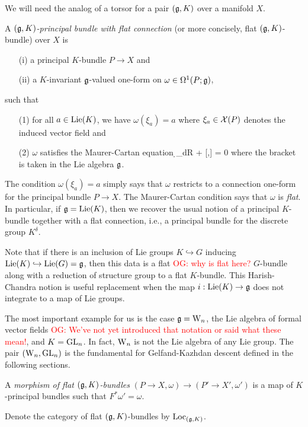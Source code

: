 \documentclass[10pt]{amsart}
\def\owen{\textcolor{red}{OG: }\textcolor{red}}
\begin{document}
We will need the analog of a torsor for a pair $(\mathfrak g,K)$ over a
manifold $X$.


\begin{dfn} \label{gkbun}
A {\em $(\mathfrak g,K)$-principal bundle with flat connection} (or more concisely, flat $(\mathfrak g,K)$-bundle) over $X$ is 
\begin{itemize}
\item[(i)] a principal $K$-bundle $P \to X$ and
\item[(ii)] a $K$-invariant $\mathfrak g$-valued one-form on $\omega \in \Omega^1(P; \mathfrak g)$, 
\end{itemize}
such that 
\begin{itemize}
\item[(1)] for all $a \in {\rm Lie}(K)$, we have $\omega(\xi_a) = a$ where $\xi_a \in \mathcal X(P)$ denotes the induced vector field and 
\item[(2)] $\omega$ satisfies the Maurer-Cartan equation
\ben
\d_{dR} \omega + [\omega,\omega] = 0
\een
where the bracket is taken in the Lie algebra $\mathfrak g$. 
\end{itemize}
\end{dfn}

The condition $\omega(\xi_a) = a$ simply says that $\omega$ restricts to a connection one-form for the principal bundle $P \to X$. 
The Maurer-Cartan condition says that $\omega$ is {\em flat}. 
In particular, if $\mathfrak g = {\rm Lie}(K)$, then we recover the usual notion of a principal $K$-bundle together with a flat connection, i.e., a principal bundle for the discrete group $K^\delta$. 


Note that if there is an inclusion of Lie groups $K \hookrightarrow G$ inducing ${\rm Lie}(K) \hookrightarrow {\rm Lie}(G) = \mathfrak g$, 
then this data is a flat \owen{why is flat here?} $G$-bundle along with a reduction of structure group to a flat $K$-bundle.
This Harish-Chandra notion is useful replacement when the map $i:
{\rm Lie}(K) \to \mathfrak g$ does not integrate to a map of Lie groups. 

\begin{ex} 
The most important example for us is the case $\mathfrak g = {{\rm W}_n}$, the Lie algebra
of formal vector fields \owen{We've not yet introduced that notation or said what these mean!}, and $K = {\rm GL}_n$. In fact, ${{\rm W}_n}$ is not the
Lie algebra of any Lie group. The pair $({{\rm W}_n},{\rm GL}_n)$ is the
fundamental for Gelfand-Kazhdan descent defined in the following sections.
\end{ex}

\begin{dfn}
A {\em morphism of flat $(\mathfrak g,K)$-bundles} $(P \to X, \omega) \to (P' \to X', \omega')$ is a map of $K$-principal bundles
\ben
{}
\een
such that $F^* \omega' = \omega$. 

Denote the category of flat $(\mathfrak g,K)$-bundles by ${\rm Loc}_{(\mathfrak g,K)}$. 
\end{dfn}
\end{document}
